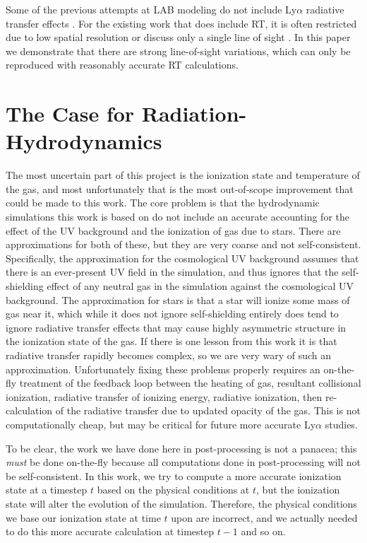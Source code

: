 Some of the previous attempts at LAB modeling do not include Ly$\alpha$ radiative transfer effects \citep{Fardal2001, Furlanetto2005, Goerdt2010, Smailagi2016, Rosdahl2012}.
For the existing work that does include RT, it is often restricted due to low spatial resolution \citep{Cen2013} or discuss only a single line of sight \citep{Cantalupo2005}.
In this paper we demonstrate that there are strong line-of-sight variations, which can only be reproduced with reasonably accurate RT calculations.

\section{The Case for Radiation-Hydrodynamics}
The most uncertain part of this project is the ionization state and temperature of the gas, and most unfortunately that is the most out-of-scope improvement that could be made to this work.
The core problem is that the hydrodynamic simulations this work is based on do not include an accurate accounting for the effect of the UV background and the ionization of gas due to stars.
There are approximations for both of these, but they are very coarse and not self-consistent.
Specifically, the approximation for the cosmological UV background assumes that there is an ever-present UV field in the simulation, and thus ignores that the self-shielding effect of any neutral gas in the simulation against the cosmological UV background.
The approximation for stars is that a star will ionize some mass of gas near it, which while it does not ignore self-shielding entirely does tend to ignore radiative transfer effects that may cause highly asymmetric structure in the ionization state of the gas.
If there is one lesson from this work it is that radiative transfer rapidly becomes complex, so we are very wary of such an approximation. 
Unfortunately fixing these problems properly requires an on-the-fly treatment of the feedback loop between the heating of gas, resultant collisional ionization, radiative transfer of ionizing energy, radiative ionization, then re-calculation of the radiative transfer due to updated opacity of the gas.
This is not computationally cheap, but may be critical for future more accurate Ly$\alpha$ studies.

To be clear, the work we have done here in post-processing is not a panacea; this \emph{must} be done on-the-fly because all computations done in post-processing will not be self-consistent.
In this work, we try to compute a more accurate ionization state at a timestep $t$ based on the physical conditions at $t$, but the ionization state will alter the evolution of the simulation.
Therefore, the physical conditions we base our ionization state at time $t$ upon are incorrect, and we actually needed to do this more accurate calculation at timestep $t-1$ and so on.

